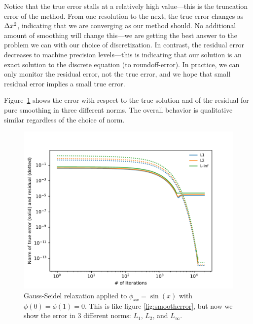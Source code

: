 Notice that the true error stalls at a relatively high value---this is
the truncation error of the method.  From one resolution to the next,
the true error changes as $\Delta x^2$, indicating that we are
converging as our method should.  No additional amount of smoothing
will change this---we are getting the best answer to the problem we
can with our choice of discretization.
In contrast, the residual error decreases to machine precision
levels---this is indicating that our solution is an exact solution to
the discrete equation (to roundoff-error).
In practice, we can only monitor the residual error, not the true
error, and we hope that small residual error implies a small true
error.

Figure~\ref{fig:smoothnorms} shows the error with respect to the true
solution and of the residual for pure smoothing in three different
norms.  The overall behavior is qualitative similar regardless of the
choice of norm.

\begin{figure}
\centering
\includegraphics[width=\linewidth]{smooth-error-norms}
\caption[Convergence of smoothing in different norms]{\label{fig:smoothnorms} 
  Gauss-Seidel relaxation applied to $\phi_{xx} = \sin(x)$ with
  $\phi(0) = \phi(1) = 0$.  This is like figure \ref{fig:smootherror}, but
  now we show the error in 3 different norms: $L_1$, $L_2$, and $L_\infty$.
  \\ }
\end{figure}

